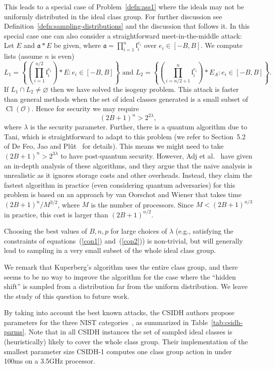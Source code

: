 \documentclass{llncs}
\newcommand{\OO}{\mathcal{O}}
\DeclareMathOperator{\Cl}{Cl}
\renewcommand{\a}{\mathfrak{a}}
\renewcommand{\l}{\mathfrak{l}}
\begin{document}
This leads to a special case of Problem~\ref{defn:ass1} where the ideals may not be uniformly distributed in the ideal class group. For further discussion see Definition~\ref{defn:sampling-distributions} and the discussion that follows it.
In this special case one can also consider a straightforward meet-in-the-middle attack: Let $E$ and $\a * E$ be given, where $\a = \prod_{i=1}^n \l_i^{e_i}$ over $e_i \in [-B, B]$.
We compute lists (assume $n$ is even)
\[
   L_1 = \left\{ \left( \prod_{i=1}^{n/2} \l_i^{e_i} \right) * E : e_i \in [-B,B] \right\} \text{ \ \  and \ \  }
   L_2 = \left\{ \left( \prod_{i=n/2 + 1}^{n} \l_i^{e_i} \right) * E_A : e_i \in [-B,B] \right\}.
\]
If $L_1 \cap L_2 \ne \varnothing$ then we have solved the isogeny problem.
This attack is faster than general methods when the set of ideal classes generated is a small subset of $\Cl( \OO )$.
Hence for security we may require
\begin{equation} \label{con2}
   (2B+1)^n > 2^{2 \lambda},
\end{equation}
where $\lambda$ is the security parameter.
Further, there is a quantum algorithm due to Tani, which is straightforward to adapt to this problem (we refer to Section~5.2 of De Feo, Jao and Pl{\^{u}}t~\cite{FJP14} for details).
This means we might need to take $(2B+1)^n > 2^{3 \lambda}$ to have post-quantum security.
However, Adj et al.~\cite{adj+menezes+al-isogenies} have given an in-depth analysis of these algorithms, and they argue that the naive analysis is unrealistic as it ignores storage costs and other overheads.
Instead, they claim the fastest algorithm in practice (even considering quantum adversaries) for this problem is based on an approach by van Oorschot and Wiener that takes time $(2B+1)^n/M^{3/2}$, where $M$ is the number of processors.
Since $M < (2B+1)^{n/3}$ in practice, this cost is larger than $(2B+1)^{n/2}$.

Choosing the best values of $B,n,p$ for large choices of $\lambda$ (e.g., satisfying the constraints of equations~(\ref{con1}) and~(\ref{con2})) is non-trivial, but will generally lead to sampling in a very small subset of the whole ideal class group.


We remark that Kuperberg's algorithm uses the entire class group, and there seems to be no way to improve the algorithm for the case where the ``hidden shift'' is sampled from a distribution far from the uniform distribution.
We leave the study of this question to future work.




By taking into account the best known attacks, the CSIDH authors propose parameters for the three NIST categories~\cite{NIST2016}, as summarized in Table~\ref{tab:csidh-parms}.
Note that in all CSIDH instances the set of sampled ideal classes is (heuristically) likely to cover the whole class group.
Their implementation of the smallest parameter size CSIDH-1 computes one class group action in under 100ms on a 3.5GHz processor.
\end{document}
